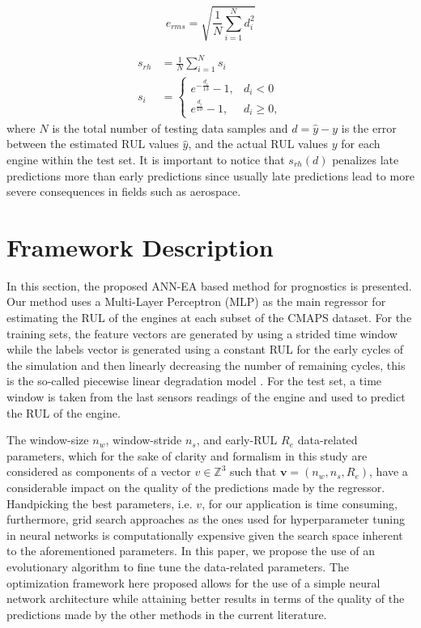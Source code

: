 \documentclass[12pt]{IEEEtran}%
\begin{document}
\begin{equation}
e_{rms} = \sqrt{ \frac{1}{N} \sum_{i=1}^{N}{d_{i}^{2}}} \label{eq:rmse}%
\end{equation}

\begin{align}
s_{rh}  &  = \frac{1}{N} \sum_{i=1}^{N}{s_{i}}\nonumber\\
s_{i}  &  =
\begin{cases}
e^{-\frac{d_{i}}{13}} - 1, & d_{i} < 0\\
e^{\frac{d_{i}}{10}} - 1, & d_{i} \geq0,
\end{cases}
\label{eq:rhs}%
\end{align}
where $N$ is the total number of testing data samples and $d = \hat{y} - y$ is
the error between the estimated RUL values $\hat{y}$, and the actual RUL
values $y$ for each engine within the test set. It is important to notice that
$s_{rh}(d)$ penalizes late predictions more than early predictions since
usually late predictions lead to more severe consequences in fields such as aerospace.

\section{Framework Description}
\label{sec:method}

In this section, the proposed ANN-EA based method for prognostics is
presented. Our method uses a Multi-Layer Perceptron (MLP) as the main
regressor for estimating the RUL of the engines at each subset of the CMAPS
dataset. For the training sets, the feature vectors are generated by using a
strided time window while the labels vector is generated using a constant RUL
for the early cycles of the simulation and then linearly decreasing the number
of remaining cycles, this is the so-called piecewise linear degradation model
\cite{Ramasso2014}. For the test set, a time window is taken from the last
sensors readings of the engine and used to predict the RUL of the engine.

The window-size $n_{w}$, window-stride $n_{s}$, and early-RUL $R_{e}$
data-related parameters, which for the sake of clarity and formalism in this
study are considered as components of a vector $v \in\mathbb{Z}^{3}$ such that
$\mathbf{v} = (n_{w}, n_{s}, R_{e})$, have a considerable impact on the
quality of the predictions made by the regressor. Handpicking the best
parameters, i.e. $v$, for our application is time consuming, furthermore, grid
search approaches as the ones used for hyperparameter tuning in neural
networks is computationally expensive given the search space inherent to the
aforementioned parameters. In this paper, we propose the use of an
evolutionary algorithm to fine tune the data-related parameters. The
optimization framework here proposed allows for the use of a simple neural
network architecture while attaining better results in terms of the quality of
the predictions made by the other methods in the current literature.
\end{document}

